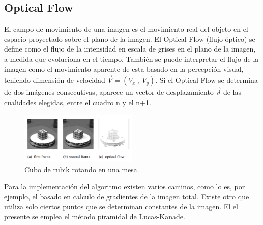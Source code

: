 \subsection{Optical Flow} 
El campo de movimiento de una imagen es el movimiento real del objeto en el espacio proyectado sobre el plano de la imagen. El Optical Flow (flujo óptico) se define como el flujo de la intensidad en escala de grises en el plano de la imagen, a medida que evoluciona en el tiempo. También se puede interpretar el flujo de la imagen como el movimiento aparente de esta basado en la percepción visual, teniendo dimensión de velocidad $\vec{V}= (V_x \ , \ V_y)$. Si el Optical Flow se determina de dos imágenes consecutivas, aparece un vector de desplazamiento $\vec{d}$ de las cualidades elegidas, entre el cuadro n y el n+1.
\begin{figure}[H]
		\centering
		\includegraphics[width=0.5\textwidth]{Imagenes/opticalflowrubick.png}
		\caption{Cubo de rubik rotando en una mesa.}
		\label{fig:opticalflow1}
\end{figure}
Para la implementación del algoritmo existen varios caminos, como lo es, por ejemplo, el basado en calculo de gradientes de la imagen total. Existe otro que utiliza solo ciertos puntos que se determinan constantes de la imagen. El el presente se emplea el método piramidal de Lucas-Kanade.

